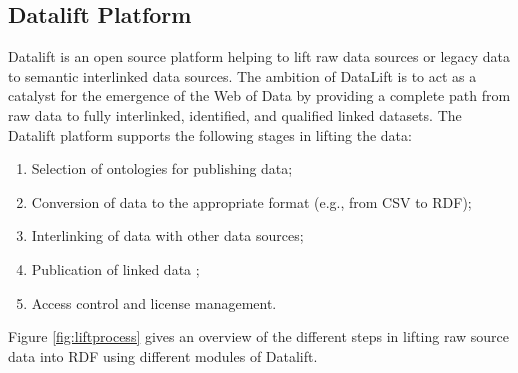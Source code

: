 \subsection{Datalift Platform}
\label{sec:datalift}
Datalift is an open source platform \cite{scharffe_2012} helping to lift raw data sources or legacy data to semantic interlinked data sources.
The ambition of DataLift is to act as a catalyst for the emergence of the Web of Data by providing a complete path from raw data to fully interlinked, identified, and qualified linked datasets. The Datalift platform supports the following stages in lifting the data:
\begin{enumerate}
\item Selection of ontologies for publishing data;
\item Conversion of data to the appropriate format (e.g., from CSV to RDF);
\item Interlinking of data with other data sources;
\item Publication of linked data ;
\item Access control and license management.
\end{enumerate}

Figure \ref{fig:liftprocess} gives an overview of the different steps in lifting raw source data into RDF using different modules of Datalift.

\begin{figure}[!htp]
\end{figure}


